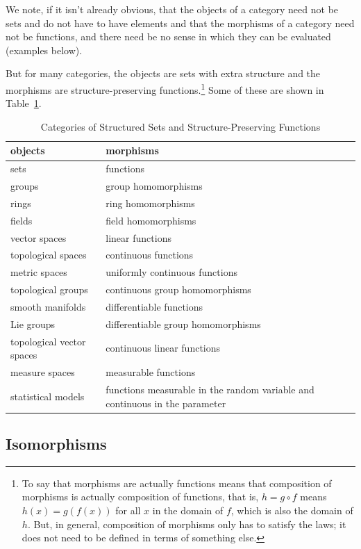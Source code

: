 \documentclass[11pt]{article}
\begin{document}
We note, if it isn't already obvious, that the objects of a category need
not be sets and do not have to have elements and that the morphisms of a
category need not be functions, and there need be no sense in which they
can be evaluated (examples below).

But for many categories, the objects are sets with extra structure and the
morphisms are structure-preserving functions.\footnote{To say that morphisms
are actually functions means that composition of morphisms is actually
composition of functions, that is, $h = g \circ f$ means $h(x) = g(f(x))$
for all $x$ in the domain of $f$, which is also the domain of $h$.
But, in general, composition of morphisms only has to satisfy
the laws; it does not need to be defined in terms of something else.}
Some of these are shown in Table~\ref{tab:categories}.
\begin{table}
\caption{Categories of Structured Sets and Structure-Preserving Functions}
\begin{center}
\begin{tabular}{lp{2.75in}}
objects & morphisms \\
\hline
sets & functions \\
groups & group homomorphisms \\
rings & ring homomorphisms \\
fields & field homomorphisms \\
vector spaces & linear functions \\
topological spaces & continuous functions \\
metric spaces & uniformly continuous functions \\
topological groups & continuous group homomorphisms \\
smooth manifolds & differentiable functions \\
Lie groups & differentiable group homomorphisms \\
topological vector spaces & continuous linear functions \\
measure spaces & measurable functions \\
statistical models & functions measurable in the random variable
    and continuous in the parameter
\end{tabular}
\end{center}
\label{tab:categories}
\end{table}

\subsection{Isomorphisms}
\label{sec:iso}
\end{document}
